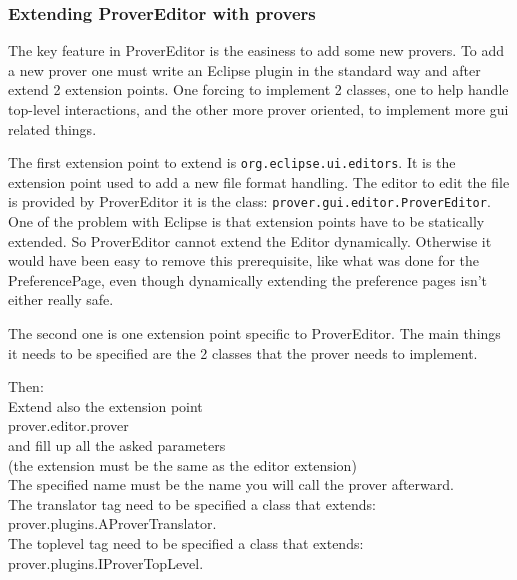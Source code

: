 \documentclass{entcs}
\begin{document}
\subsubsection{Extending ProverEditor with provers}
\label{subsubsec:extend-prov-with}

The key feature in ProverEditor is the easiness to add
some new provers. To add a new prover one must write an Eclipse plugin
in the standard way and after extend 2 extension points. One forcing
to implement 2 classes, one to help handle top-level interactions, and
the other more prover oriented, to implement more gui related things.

The first extension point to extend is {\tt org.eclipse.ui.editors}.
It is the extension point used to add a new file format handling.
The editor to edit the file is provided by ProverEditor it is the class:
{\tt prover.gui.editor.ProverEditor}. One of the problem with Eclipse
is that extension points have to be statically extended. So ProverEditor
cannot extend the Editor dynamically. Otherwise it would have been easy
to remove this prerequisite, like what was done for the PreferencePage,
even though dynamically extending the preference pages isn't either 
really safe.


The second one is one extension point specific to ProverEditor.
The main things it needs to be specified are the 2 classes that the prover
needs to implement.

Then:\\
Extend also the extension point\\
prover.editor.prover\\
and fill up all the asked parameters\\
(the extension must be the same as the editor extension)\\
The specified name must be the name you will call the prover afterward.\\
The translator tag need to be specified a class that extends:\\
prover.plugins.AProverTranslator.\\
The toplevel tag need to be specified a class that extends:\\
prover.plugins.IProverTopLevel.\\

\end{document}
